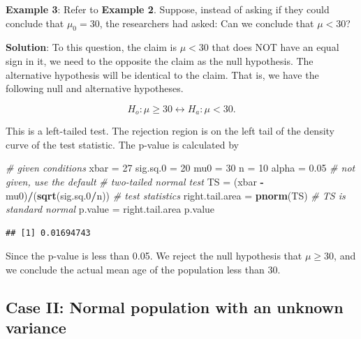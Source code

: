 \documentclass[
]{book}
\newenvironment{Shaded}{\begin{snugshade}}{\end{snugshade}}
\newcommand{\CommentTok}[1]{\textcolor[rgb]{0.56,0.35,0.01}{\textit{#1}}}
\newcommand{\DecValTok}[1]{\textcolor[rgb]{0.00,0.00,0.81}{#1}}
\newcommand{\FloatTok}[1]{\textcolor[rgb]{0.00,0.00,0.81}{#1}}
\newcommand{\FunctionTok}[1]{\textcolor[rgb]{0.13,0.29,0.53}{\textbf{#1}}}
\newcommand{\NormalTok}[1]{#1}
\newcommand{\OtherTok}[1]{\textcolor[rgb]{0.56,0.35,0.01}{#1}}
\newcommand{\SpecialCharTok}[1]{\textcolor[rgb]{0.81,0.36,0.00}{\textbf{#1}}}
\begin{document}
\textbf{Example 3}: Refer to \textbf{Example 2}. Suppose, instead of asking if they could conclude that \(\mu_0= 30\), the
researchers had asked: Can we conclude that \(\mu < 30\)?

\textbf{Solution}: To this question, the claim is \(\mu < 30\) that does NOT have an equal sign in it, we need to the opposite the claim as the null hypothesis. The alternative hypothesis will be identical to the claim. That is, we have the following null and alternative hypotheses.

\[
H_o: \mu \ge 30  \leftrightarrow  H_a: \mu < 30.
\]

This is a left-tailed test. The rejection region is on the left tail of the density curve of the test statistic. The p-value is calculated by

\begin{Shaded}
\begin{Highlighting}[]
\CommentTok{\# given conditions}
\NormalTok{xbar }\OtherTok{=} \DecValTok{27}
\NormalTok{sig.sq}\FloatTok{.0} \OtherTok{=} \DecValTok{20}
\NormalTok{mu0 }\OtherTok{=} \DecValTok{30}
\NormalTok{n }\OtherTok{=} \DecValTok{10}
\NormalTok{alpha }\OtherTok{=} \FloatTok{0.05}   \CommentTok{\# not given, use the default}
\CommentTok{\# two{-}tailed normal test}
\NormalTok{TS }\OtherTok{=}\NormalTok{ (xbar }\SpecialCharTok{{-}}\NormalTok{ mu0)}\SpecialCharTok{/}\NormalTok{(}\FunctionTok{sqrt}\NormalTok{(sig.sq}\FloatTok{.0}\SpecialCharTok{/}\NormalTok{n))    }\CommentTok{\# test statistics}
\NormalTok{right.tail.area }\OtherTok{=} \FunctionTok{pnorm}\NormalTok{(TS)         }\CommentTok{\# TS is standard normal}
\NormalTok{p.value }\OtherTok{=}\NormalTok{ right.tail.area}
\NormalTok{p.value}
\end{Highlighting}
\end{Shaded}

\begin{verbatim}
## [1] 0.01694743
\end{verbatim}

Since the p-value is less than 0.05. We reject the null hypothesis that \(\mu \ge 30\), and we conclude the actual mean age of the population less than 30.

\hypertarget{case-ii-normal-population-with-an-unknown-variance}{%
\subsection{Case II: Normal population with an unknown variance}\label{case-ii-normal-population-with-an-unknown-variance}}
\end{document}

